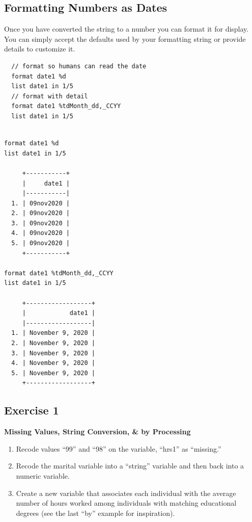 \documentclass[]{book}
\providecommand{\tightlist}{%
  \setlength{\itemsep}{0pt}\setlength{\parskip}{0pt}}
\begin{document}
\hypertarget{formatting-numbers-as-dates}{%
\subsection{Formatting Numbers as Dates}\label{formatting-numbers-as-dates}}

Once you have converted the string to a number you can format it for display. You can simply accept the defaults used by your formatting string or provide details to customize it.

\begin{verbatim}
  // format so humans can read the date
  format date1 %d
  list date1 in 1/5
  // format with detail
  format date1 %tdMonth_dd,_CCYY
  list date1 in 1/5
\end{verbatim}

\begin{verbatim}

format date1 %d
list date1 in 1/5

     +-----------+
     |     date1 |
     |-----------|
  1. | 09nov2020 |
  2. | 09nov2020 |
  3. | 09nov2020 |
  4. | 09nov2020 |
  5. | 09nov2020 |
     +-----------+

format date1 %tdMonth_dd,_CCYY
list date1 in 1/5

     +------------------+
     |            date1 |
     |------------------|
  1. | November 9, 2020 |
  2. | November 9, 2020 |
  3. | November 9, 2020 |
  4. | November 9, 2020 |
  5. | November 9, 2020 |
     +------------------+
\end{verbatim}

\hypertarget{exercise-1-7}{%
\subsection{Exercise 1}\label{exercise-1-7}}

\textbf{Missing Values, String Conversion, \& by Processing}

\begin{enumerate}
\def\labelenumi{\arabic{enumi}.}
\tightlist
\item
  Recode values ``99'' and ``98'' on the variable, ``hrs1'' as ``missing.''
\item
  Recode the marital variable into a ``string'' variable and then back into a numeric variable.
\item
  Create a new variable that associates each individual with the average number of hours worked among individuals with matching educational degrees (see the last ``by'' example for inspiration).
\end{enumerate}
\end{document}

